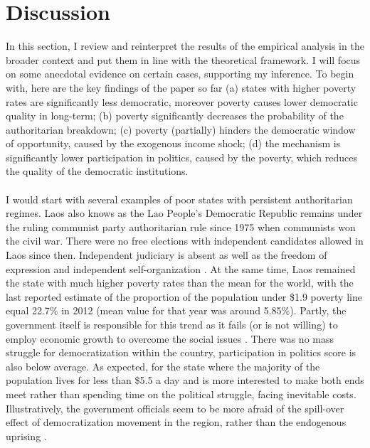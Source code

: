 \documentclass[a4paper, 12pt]{article}
\begin{document}
   

    
    
    
        
    
	
	\section{Discussion}
	
	In this section, I review and reinterpret the results of the empirical analysis in the broader context and put them in line with the theoretical framework. I will focus on some anecdotal evidence on certain cases, supporting my inference. To begin with, here are the key findings of the paper so far (a) states with higher poverty rates are significantly less democratic, moreover poverty causes lower democratic quality in long-term; (b) poverty significantly decreases the probability of the authoritarian breakdown; (c) poverty (partially) hinders the democratic window of opportunity, caused by the exogenous income shock; (d) the mechanism is significantly lower participation in politics, caused by the poverty, which reduces the quality of the democratic institutions.
	\\\\
	I would start with several examples of poor states with persistent authoritarian regimes. Laos also knows as the Lao People's Democratic Republic remains under the ruling communist party authoritarian rule since 1975 when communists won the civil war. There were no free elections with independent candidates allowed in Laos since then. Independent judiciary is absent as well as the freedom of expression and independent self-organization \parencite{laos}. At the same time, Laos remained the state with much higher poverty rates than the mean for the world, with the last reported estimate of the proportion of the population under \$1.9 poverty line equal 22.7\% in 2012 (mean value for that year was around 5.85\%). Partly, the government itself is responsible for this trend as it fails (or is not willing) to employ economic growth to overcome the social issues \parencite{laos2}. There was no mass struggle for democratization within the country, participation in politics score is also below average. As expected, for the state where the majority of the population lives for less than \$5.5 a day and is more interested to make both ends meet rather than spending time on the political struggle, facing inevitable costs. Illustratively, the government officials seem to be more afraid of the spill-over effect of democratization movement in the region, rather than the endogenous uprising \parencite{laos3}.
\end{document}
